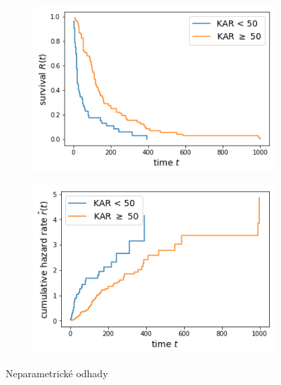 \documentclass[10pt]{article}
\begin{document}
\begin{figure}[htb!]
\centering
  \begin{subfigure}{.4\linewidth}
    \centering
    \includegraphics[width=.99\textwidth]{Images/kmkar.png}
  \end{subfigure}%
    \begin{subfigure}{.4\linewidth}
    \centering
    \includegraphics[width=.99\textwidth]{Images/nakar.png}
  \end{subfigure}%
  \caption{Neparametrické odhady}\label{fig:karkm} 
    \end{figure}
    
\end{document}
